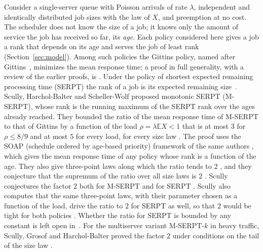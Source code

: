 \documentclass[11pt]{amsart}
\theoremstyle{remark}
\numberwithin{equation}{section}
\newcommand{\E}{\mathbb{E}}
\begin{document}
Consider a single-server queue with Poisson arrivals of rate $\lambda$,
independent and identically distributed job sizes with the law of $X$, and
preemption at no cost. The scheduler does not know the size of a job; it
knows only the amount of service the job has received so far, its
\emph{age}. Each policy considered here gives a job a rank that depends
on its age and serves the job of least rank (Section~\ref{sec:model}).
Among such policies the Gittins policy, named after Gittins~\cite{Git89},
minimizes the mean response time; a proof in full generality, with a review
of the earlier proofs, is \cite[Theorem~V.1 and Section~II]{SH21}. Under the policy of shortest expected
remaining processing time (SERPT) the rank of a job is its expected
remaining size~\cite[Definition~2.2]{SHS20}. Scully, Harchol-Balter and Scheller-Wolf
\cite{SHS20} proposed monotonic SERPT (M-SERPT), whose rank is the
running maximum of the SERPT rank over the ages already reached. They bounded
the ratio of the mean response time of M-SERPT to that of Gittins by a
function of the load $\rho=\lambda\E X<1$ that is at most $3$ for
$\rho\le8/9$ and at most $5$ for every load, for every size law
\cite[Theorem~5.1 and Corollary~5.2]{SHS20}. The proof uses the SOAP (schedule ordered
by age-based priority) framework of the same authors \cite{SHS18}, which
gives the mean response time of any policy whose rank is a function of the
age. They also give three-point laws along which the ratio
tends to $2$ \cite[Section~7]{SHS20}, and they conjecture that the
supremum of the ratio over all size laws is $2$
\cite[Conjecture~8.1]{SHS20}. Scully conjectures the factor $2$ both for M-SERPT
and for SERPT \cite[Chapter~11]{Scu22}. Scully also computes that the same
three-point laws, with their parameter chosen as a function of the load, drive the
ratio to $2$ for SERPT as well, so that $2$ would be tight for both policies
\cite[Section~11.3]{Scu22}. Whether the ratio for SERPT is bounded by any
constant is left open in~\cite{SHS20}. For the multiserver variant
M-SERPT-$k$ in heavy traffic, Scully, Grosof and Harchol-Balter proved the
factor $2$ under conditions on the tail of the size law
\cite[Theorem~3.2]{SGH21}.
\end{document}
